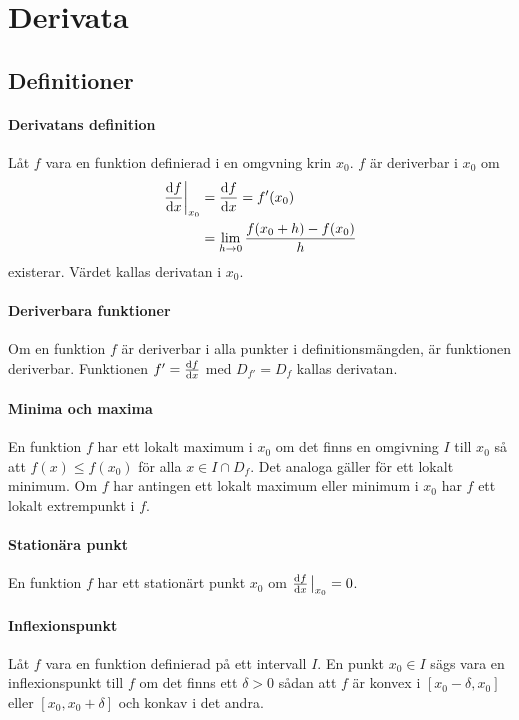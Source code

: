 \section{Derivata}

\subsection{Definitioner}

\paragraph{Derivatans definition}
Låt $f$ vara en funktion definierad i en omgvning krin $x_0$. $f$ är deriverbar i $x_0$ om
\begin{align*}
	\eval{\dv{f}{x}}_{x_0} &= \dv{f}{x} (x_0) = f'(x_0) \\
	                           &= \lim\limits_{h\to 0}\frac{f(x_0 + h) - f(x_0)}{h}
\end{align*}
existerar. Värdet kallas derivatan i $x_0$.

\paragraph{Deriverbara funktioner}
Om en funktion $f$ är deriverbar i alla punkter i definitionsmängden, är funktionen deriverbar. Funktionen $f' = \dv{f}{x}$ med $D_{f'} = D_f$ kallas derivatan.

\paragraph{Minima och maxima}
En funktion $f$ har ett lokalt maximum i $x_0$ om det finns en omgivning $I$ till $x_0$ så att $f(x)\leq f(x_0)$ för alla $x\in I\cap D_f$. Det analoga gäller för ett lokalt minimum. Om $f$ har antingen ett lokalt maximum eller minimum i $x_0$ har $f$ ett lokalt extrempunkt i $f$.

\paragraph{Stationära punkt}
En funktion $f$ har ett stationärt punkt $x_0$ om $\dv{f}{x}\eval_{x_0} = 0$.

\paragraph{Inflexionspunkt}
Låt $f$ vara en funktion definierad på ett intervall $I$. En punkt $x_0\in I$ sägs vara en inflexionspunkt till $f$ om det finns ett $\delta > 0$ sådan att $f$ är konvex i $[x_0 - \delta, x_0]$ eller $[x_0, x_0 + \delta]$ och konkav i det andra.

